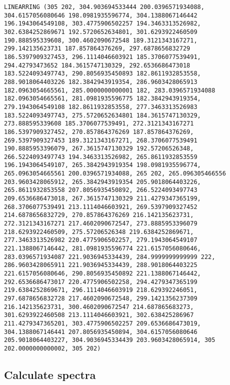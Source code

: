 \documentclass{article}
\begin{document}
\begin{Verbatim}[commandchars=\\\{\}]
LINEARRING (305 202, 304.903694533444 200.0396571934088, 304.6157056080646 198.0981935596774, 304.1388067146442 196.1943064549108, 303.4775906502257 194.3463313526982, 302.6384252869671 192.5720652634801, 301.6293922460509 190.888595339608, 300.4602090672548 189.3121343167271, 299.142135623731 187.857864376269, 297.6878656832729 186.5397909327453, 296.1114046603921 185.3706077539491, 294.42793473652 184.3615747130329, 292.6536686473018 183.5224093497743, 290.8056935450893 182.8611932853558, 288.9018064403226 182.3842943919354, 286.9603428065913 182.0963054665561, 285.0000000000001 182, 283.0396571934088 182.0963054665561, 281.0981935596775 182.3842943919354, 279.1943064549108 182.8611932853558, 277.3463313526983 183.5224093497743, 275.5720652634801 184.3615747130329, 273.888595339608 185.3706077539491, 272.3121343167271 186.5397909327452, 270.857864376269 187.857864376269, 269.5397909327453 189.3121343167271, 268.3706077539491 190.8885953396079, 267.3615747130329 192.57206526348, 266.5224093497743 194.3463313526982, 265.8611932853559 196.1943064549107, 265.3842943919354 198.0981935596774, 265.0963054665561 200.0396571934088, 265 202, 265.096305466556 203.9603428065912, 265.3842943919354 205.9018064403226, 265.8611932853558 207.8056935450892, 266.5224093497743 209.6536686473018, 267.3615747130329 211.4279347365199, 268.3706077539491 213.1114046603921, 269.5397909327452 214.6878656832729, 270.857864376269 216.142135623731, 272.3121343167271 217.4602090672547, 273.8885953396079 218.6293922460509, 275.57206526348 219.6384252869671, 277.3463313526982 220.4775906502257, 279.1943064549107 221.1388067146442, 281.0981935596774 221.6157056080646, 283.0396571934087 221.9036945334439, 284.9999999999999 222, 286.9603428065911 221.9036945334439, 288.9018064403225 221.6157056080646, 290.8056935450892 221.1388067146442, 292.6536686473017 220.4775906502258, 294.4279347365199 219.6384252869671, 296.1114046603919 218.629392246051, 297.6878656832728 217.4602090672548, 299.1421356237309 216.142135623731, 300.4602090672547 214.687865683273, 301.6293922460508 213.1114046603921, 302.638425286967 211.4279347365201, 303.4775906502257 209.6536686473019, 304.1388067146441 207.8056935450894, 304.6157056080646 205.9018064403227, 304.9036945334439 203.9603428065914, 305 202.0000000000002, 305 202)
    \end{Verbatim}


    \subsection{Calculate spectra}
\end{document}
